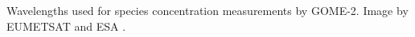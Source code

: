 \label{fig:gomeproducts}
Wavelengths used for species concentration measurements by GOME-2. Image by EUMETSAT and ESA \cite{GOME2Image}.